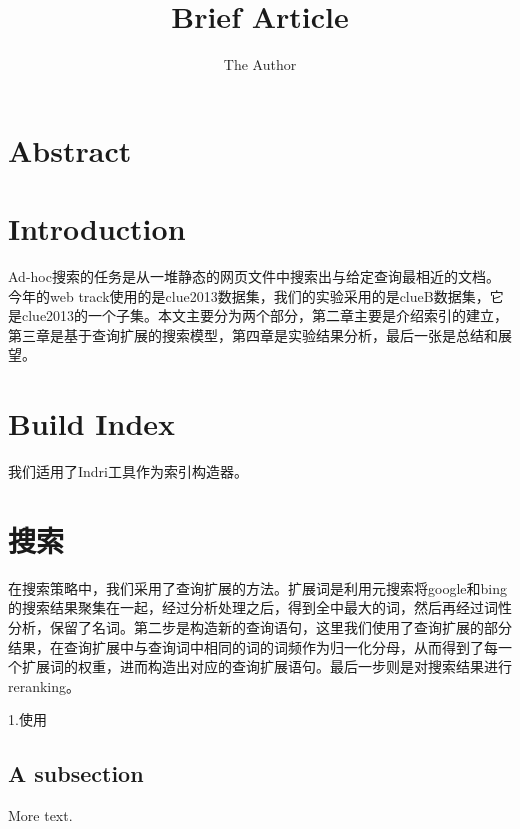 \documentclass[11pt]{article} %
\title{Brief Article}
\author{The Author}
\begin{document}
\begin{CJK}{UTF8}{gkai}
\maketitle

\section{Abstract}


\section{Introduction}

Ad-hoc搜索的任务是从一堆静态的网页文件中搜索出与给定查询最相近的文档。今年的web track使用的是clue2013数据集，我们的实验采用的是clueB数据集，它是clue2013的一个子集。本文主要分为两个部分，第二章主要是介绍索引的建立，第三章是基于查询扩展的搜索模型，第四章是实验结果分析，最后一张是总结和展望。

\section{Build Index}
我们适用了Indri工具作为索引构造器。

\section{搜索}
在搜索策略中，我们采用了查询扩展的方法。扩展词是利用元搜索将google和bing的搜索结果聚集在一起，经过分析处理之后，得到全中最大的词，然后再经过词性分析，保留了名词。第二步是构造新的查询语句，这里我们使用了查询扩展的部分结果，在查询扩展中与查询词中相同的词的词频作为归一化分母，从而得到了每一个扩展词的权重，进而构造出对应的查询扩展语句。最后一步则是对搜索结果进行reranking。


1.使用


\subsection{A subsection}

More text.
\end{CJK}
\end{document}
